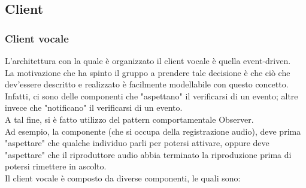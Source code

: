 \subsection{Client}
\subsubsection{Client vocale}
L'architettura con la quale è organizzato il client vocale è quella event-driven.\\
La motivazione che ha spinto il gruppo a prendere tale decisione è che ciò che dev'essere descritto e realizzato è facilmente modellabile con questo concetto. Infatti, ci sono delle componenti che "aspettano" il verificarsi di un evento; altre invece che "notificano"  il verificarsi di un evento.\\
A tal fine, si è fatto utilizzo del pattern comportamentale Observer.\\
Ad esempio, la componente  (che si occupa della registrazione audio), deve prima "aspettare" che qualche individuo parli per potersi attivare, oppure deve "aspettare" che il riproduttore audio abbia terminato la riproduzione prima di potersi rimettere in ascolto.\\
Il client vocale è composto da diverse componenti, le quali sono:
